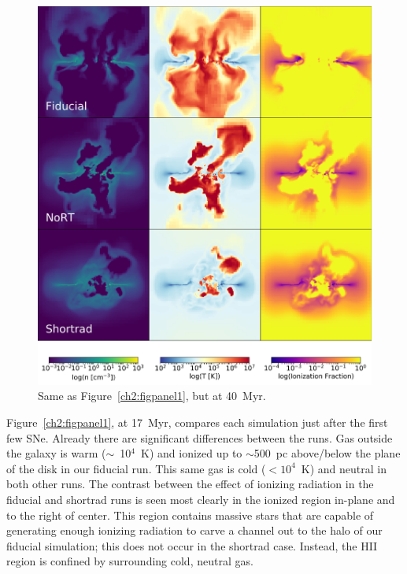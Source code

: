 \begin{figure}
\centering
\includegraphics[width=0.99\linewidth]{figures/ch2/DD0160_fiducial_shortrad_nort}
\caption{Same as Figure~\ref{ch2:figpanel1}, but at 40~Myr.}
\label{ch2:figpanel2}
\end{figure}

Figure~\ref{ch2:figpanel1}, at 17~Myr, compares each simulation just after the first few SNe. Already there are significant differences between the runs. Gas outside the galaxy is warm ($\sim$~10$^{4}$~K) and ionized up to $\sim$500~pc above/below the plane of the disk in our fiducial run. This same gas is cold ($<10^4$~K) and neutral in both other runs. The contrast between the effect of ionizing radiation in the fiducial and shortrad runs is seen most clearly in the ionized region in-plane and to the right of center. This region contains massive stars that are capable of generating enough ionizing radiation to carve a channel out to the halo of our fiducial simulation; this does not occur in the shortrad case. Instead, the HII region is confined by surrounding cold, neutral gas.

